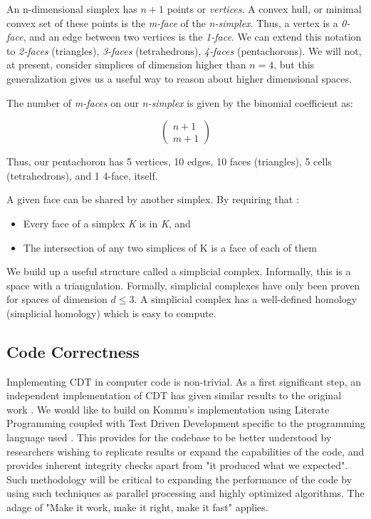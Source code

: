 \documentclass{article}
\begin{document}
An n-dimensional simplex has $n+1$ points or \emph{vertices}. A convex hull, or minimal convex set of these points is the \emph{m-face} of the \emph{n-simplex}. Thus, a vertex is a \emph{0-face}, and an edge between two vertices is the \emph{1-face}. We can extend this notation to \emph{2-faces} (triangles), \emph{3-faces} (tetrahedrons), \emph{4-faces} (pentachorons). We will not, at present, consider simplices of dimension higher than $n=4$, but this generalization gives us a useful way to reason about higher dimensional spaces.

The number of \emph{m-faces} on our \emph{n-simplex} is given by the binomial coefficient as:

\begin{equation}
\left(\begin{array}{c}n+1\\m+1\end{array}\right)
\end{equation}

Thus, our pentachoron has 5 vertices, 10 edges, 10 faces (triangles), 5 cells (tetrahedrons), and 1 4-face, itself.

A given face can be shared by another simplex. By requiring that \cite{weisstein1}:

\begin{itemize}
\item Every face of a simplex \emph{K} is in \emph{K}, and
\item The intersection of any two simplices of K is a face of each of them
\end{itemize}

We build up a useful structure called a simplicial complex. Informally, this is a space with a triangulation. Formally, simplicial complexes have only been proven for spaces of dimension $d\le3$. A simplicial complex has a well-defined homology (simplicial homology) which is easy to compute.

\subsection{Code Correctness}

Implementing CDT in computer code is non-trivial. As a first significant step, an independent implementation of CDT has given similar results to the original work \cite{kommu2011}. We would like to build on Kommu's implementation using Literate Programming \cite{knuth_literate_1984} coupled with Test Driven Development specific to the programming language used \cite{rathore_clojure_2011}. This provides for the codebase to be better understood by researchers wishing to replicate results or expand the capabilities of the code, and provides inherent integrity checks apart from "it produced what we expected". Such methodology will be critical to expanding the performance of the code by using such techniques as parallel processing and highly optimized algorithms. The adage of "Make it work, make it right, make it fast" applies.
\end{document}
